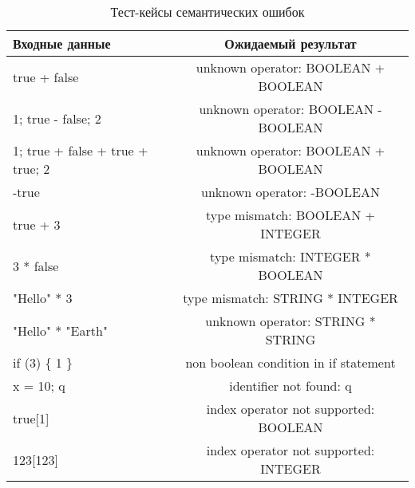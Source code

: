 \clearpage

\begin{table}[!ht]
    \Large
    \centering
    \begin{threeparttable}
        \caption{Тест-кейсы семантических ошибок}
        \label{t:testCases_semanticErrors}
        \begin{tabularx}{\textwidth}{|X|c|}
            \hline
            Входные данные                   & Ожидаемый результат                   \\
            \hline
            true + false                     & unknown operator: BOOLEAN + BOOLEAN   \\
            \hline
            1; true - false; 2               & unknown operator: BOOLEAN - BOOLEAN   \\
            \hline
            1; true + false + true + true; 2 & unknown operator: BOOLEAN + BOOLEAN   \\
            \hline
            -true                            & unknown operator: -BOOLEAN            \\
            \hline
            true + 3                         & type mismatch: BOOLEAN + INTEGER      \\
            \hline
            3 * false                        & type mismatch: INTEGER * BOOLEAN      \\
            \hline
            "Hello" * 3                      & type mismatch: STRING * INTEGER       \\
            \hline
            "Hello" * "Earth"                & unknown operator: STRING * STRING     \\
            \hline
            if (3) \{ 1 \}                   & non boolean condition in if statement \\
            \hline
            x = 10; q                        & identifier not found: q               \\
            \hline
            true{[}1{]}                      & index operator not supported: BOOLEAN \\
            \hline
            123{[}123{]}                     & index operator not supported: INTEGER \\
            \hline
        \end{tabularx}
    \end{threeparttable}
    \vspace{\bottompaddingoftable}
\end{table}

